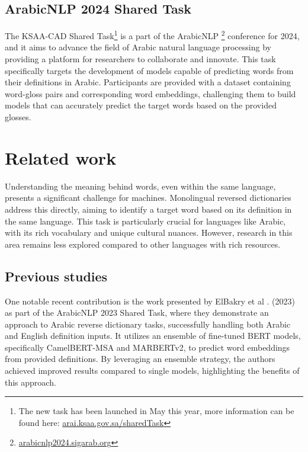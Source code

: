 \documentclass[15pt]{article}
\begin{document}
\subsection{ArabicNLP 2024 Shared Task}

The KSAA-CAD Shared Task\footnote{The new task has been launched in May this year, more information can be found here: \href{https://arai.ksaa.gov.sa/sharedTask2024/}{arai.ksaa.gov.sa/sharedTask}} is a part of the ArabicNLP \footnote{\href{https://arabicnlp2024.sigarab.org/}{arabicnlp2024.sigarab.org}} conference for 2024, and it aims to advance the field of Arabic natural language processing by providing a platform for researchers to collaborate and innovate. This task specifically targets the development of models capable of predicting words from their definitions in Arabic. Participants are provided with a dataset containing word-gloss pairs and corresponding word embeddings, challenging them to build models that can accurately predict the target words based on the provided glosses.

\newpage

\section{Related work}

Understanding the meaning behind words, even within the same language, presents a significant challenge for machines. Monolingual reversed dictionaries address this directly, aiming to identify a target word based on its definition in the same language. This task is particularly crucial for languages like Arabic, with its rich vocabulary and unique cultural nuances. However, research in this area remains less explored compared to other languages with rich resources.

\subsection{Previous studies}

One notable recent contribution is the work presented by ElBakry et al \cite{Albakry2023}. (2023) as part of the ArabicNLP 2023 Shared Task, where they demonstrate an approach to Arabic reverse dictionary tasks, successfully handling both Arabic and English definition inputs. It utilizes an ensemble of fine-tuned BERT models, specifically CamelBERT-MSA and MARBERTv2, to predict word embeddings from provided definitions. By leveraging an ensemble strategy, the authors achieved improved results compared to single models, highlighting the benefits of this approach.
\end{document}
